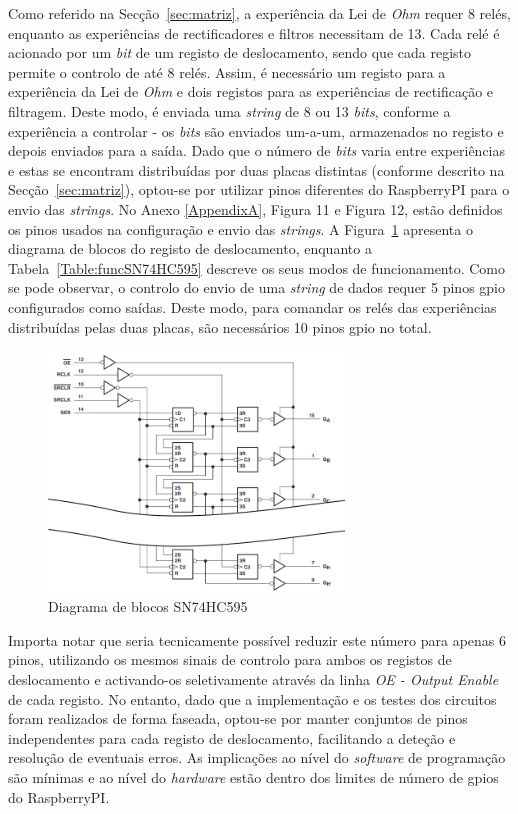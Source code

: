 Como referido na Secção~\ref{sec:matriz}, a experiência da Lei de \textit{Ohm} requer 8 relés, enquanto as experiências de rectificadores e filtros necessitam de 13. Cada relé é acionado por um \textit{bit} de um registo de deslocamento, sendo que cada registo permite o controlo de até 8 relés. Assim, é necessário um registo para a experiência da Lei de \textit{Ohm} e dois registos para as experiências de rectificação e filtragem.
Deste modo, é enviada uma \textit{string} de 8 ou 13 \textit{bits}, conforme a experiência a controlar - os \textit{bits} são enviados um-a-um, armazenados no registo e depois enviados para a saída. Dado que o número de \textit{bits} varia entre experiências e estas se encontram distribuídas por duas placas distintas (conforme descrito na Secção~\ref{sec:matriz}), optou-se por utilizar pinos diferentes do \gls{RaspberryPI} para o envio das \textit{strings}. No Anexo \ref{AppendixA}, Figura 11 e Figura 12, estão definidos os pinos usados na configuração e envio das \textit{strings}. A Figura~\ref{fig:SN74HC595blocos} apresenta o diagrama de blocos do registo de deslocamento, enquanto a Tabela~\ref{Table:funcSN74HC595} descreve os seus modos de funcionamento. Como se pode observar, o controlo do envio de uma \textit{string} de dados requer 5 pinos \acrshort{gpio} configurados como saídas. Deste modo, para comandar os relés das experiências distribuídas pelas duas placas, são necessários 10 pinos \acrshort{gpio} no total.

\begin{figure}[hbtp]
    \centering
    \includegraphics[width=0.7\textwidth]{figures/SR_blocos.png}
    \caption{Diagrama  de blocos SN74HC595 \cite{SN74HC595}}
    \label{fig:SN74HC595blocos}
\end{figure}

Importa notar que seria tecnicamente possível reduzir este número para apenas 6 pinos, utilizando os mesmos sinais de controlo para ambos os registos de deslocamento e activando-os seletivamente através da linha \textit{OE - Output Enable} de cada registo. No entanto, dado que a implementação e os testes dos circuitos foram realizados de forma faseada, optou-se por manter conjuntos de pinos independentes para cada registo de deslocamento, facilitando a deteção e resolução de eventuais erros. As implicações ao nível do \textit{software} de programação são mínimas e ao nível do \textit{hardware} estão dentro dos limites de número de \acrshort{gpio}s do \gls{RaspberryPI}.

